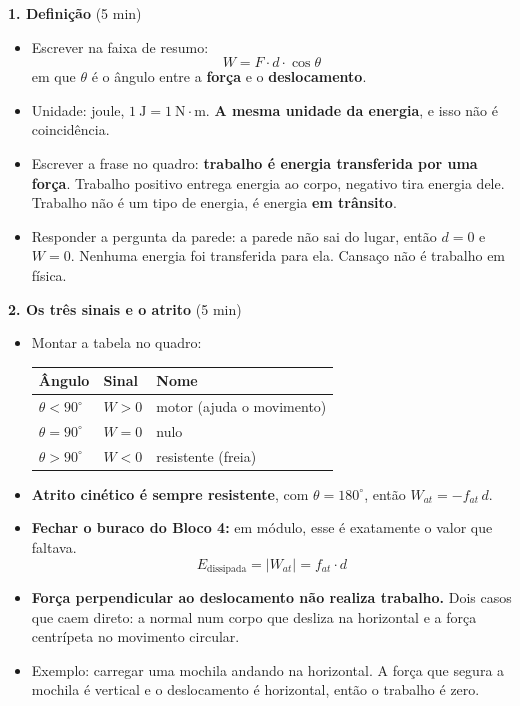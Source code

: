 \documentclass[11pt,a4paper]{article}
\begin{document}
\begin{quadro}
\textbf{1. Defini\c{c}\~ao} (5 min)
\begin{itemize}[nosep]
  \item Escrever na faixa de resumo:
  \[
    \boxed{W = F \cdot d \cdot \cos\theta}
  \]
  em que $\theta$ \'e o \^angulo entre a \textbf{for\c{c}a} e o
  \textbf{deslocamento}.
  \item Unidade: joule, $1\ \text{J} = 1\ \text{N}\cdot\text{m}$.
        \textbf{A mesma unidade da energia}, e isso n\~ao \'e
        coincid\^encia.
  \item Escrever a frase no quadro: \textbf{trabalho \'e energia
        transferida por uma for\c{c}a}. Trabalho positivo entrega
        energia ao corpo, negativo tira energia dele. Trabalho n\~ao
        \'e um tipo de energia, \'e energia \textbf{em tr\^ansito}.
  \item Responder a pergunta da parede: a parede n\~ao sai do lugar,
        ent\~ao $d = 0$ e $W = 0$. Nenhuma energia foi transferida para
        ela. Cansa\c{c}o n\~ao \'e trabalho em f\'isica.
\end{itemize}

\medskip
\textbf{2. Os tr\^es sinais e o atrito} (5 min)
\begin{itemize}[nosep]
  \item Montar a tabela no quadro:
  \begin{center}\small
    \begin{tabular}{@{}lll@{}}
      \toprule
      \^Angulo & Sinal & Nome \\
      \midrule
      $\theta < 90^\circ$ & $W > 0$ & motor (ajuda o movimento) \\
      $\theta = 90^\circ$ & $W = 0$ & nulo \\
      $\theta > 90^\circ$ & $W < 0$ & resistente (freia) \\
      \bottomrule
    \end{tabular}
  \end{center}
  \item \textbf{Atrito cin\'etico \'e sempre resistente}, com
        $\theta = 180^\circ$, ent\~ao $W_{at} = -f_{at}\,d$.
  \item \textbf{Fechar o buraco do Bloco 4:} em m\'odulo, esse \'e
        exatamente o valor que faltava.
  \[
    \boxed{E_{\text{dissipada}} = |W_{at}| = f_{at}\cdot d}
  \]
  \item \textbf{For\c{c}a perpendicular ao deslocamento n\~ao realiza
        trabalho.} Dois casos que caem direto: a normal num corpo que
        desliza na horizontal e a for\c{c}a centr\'ipeta no movimento
        circular.
  \item Exemplo: carregar uma mochila andando na horizontal. A
        for\c{c}a que segura a mochila \'e vertical e o deslocamento \'e
        horizontal, ent\~ao o trabalho \'e zero.
\end{itemize}


\end{quadro}
\end{document}
